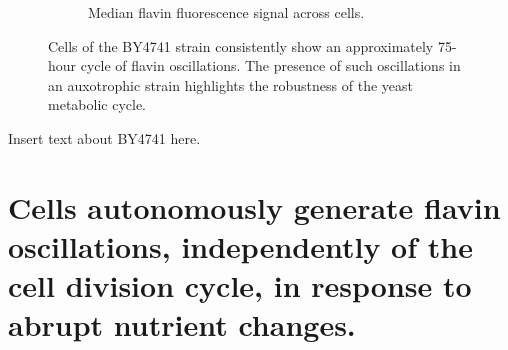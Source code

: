 \begin{figure}
\begin{subfigure}[htpb]{0.4\textwidth}
   \caption{
    Median flavin fluorescence signal across cells.%
   }
   \label{fig:biology-by4741-sync-median}
  \end{subfigure}

  \caption{
    Cells of the BY4741 strain consistently show an approximately 75-hour cycle of flavin oscillations.
    The presence of such oscillations in an auxotrophic strain highlights the robustness of the yeast metabolic cycle.
  }
  \label{fig:biology-by4741-sync}
\end{figure}

Insert text about BY4741 here.


\section[Abrupt nutrient changes]{Cells autonomously generate flavin oscillations, independently of the cell division cycle, in response to abrupt nutrient changes.}
\label{sec:biology-abrupt}

